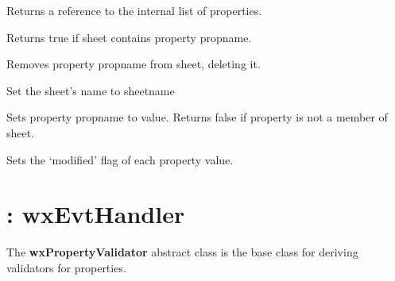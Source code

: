 \label{wxpropertysheetgetproperties}


Returns a reference to the internal list of properties.

\label{wxpropertysheethasproperty}


Returns true if sheet contains property propname.

\label{wxpropertysheetremoveproperty}


Removes property propname from sheet, deleting it.

\label{wxpropertysheetsetname}


Set the sheet's name to sheetname

\label{wxpropertysheetsetproperty}


Sets property propname to value. Returns false if property is not a member of sheet.



Sets the `modified' flag of each property value.



\section{: wxEvtHandler}\label{wxpropertyvalidator}


The {\bf wxPropertyValidator} abstract class is the base class for deriving
validators for properties.



